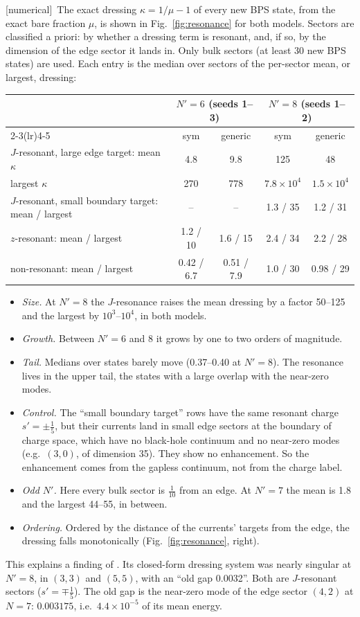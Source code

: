 \documentclass[11pt]{article}
\newcommand{\Np}{N'}
\newcommand{\sn}{s'}
\newcommand{\tagbox}[2]{\textsf{\small\color{#1}[#2]}}
\newcommand{\NUM}{\tagbox{cnum}{numerical}}
\theoremstyle{plain}
\theoremstyle{remark}
\numberwithin{equation}{section}
\begin{document}
\NUM\ The exact dressing $\kappa=1/\mu-1$ of every new BPS state, from the exact bare fraction $\mu$, is shown in
Fig.~\ref{fig:resonance} for both models.
Sectors are classified a priori: by whether a dressing term is resonant, and, if so, by the dimension of the edge sector
it lands in. Only bulk sectors (at least 30 new BPS states) are used. Each entry is the median over sectors of the
per-sector mean, or largest, dressing:
\begin{center}\small
\begin{tabular}{lcccc}
\toprule
 & \multicolumn{2}{c}{$\Np=6$ (seeds 1--3)} & \multicolumn{2}{c}{$\Np=8$ (seeds 1--2)}\\
\cmidrule(lr){2-3}\cmidrule(lr){4-5}
 & sym & generic & sym & generic\\
\midrule
$J$-resonant, large edge target: mean $\kappa$ & 4.8 & 9.8 & 125 & 48\\
\qquad largest $\kappa$ & 270 & 778 & $7.8\times10^4$ & $1.5\times10^4$\\
$J$-resonant, small boundary target: mean / largest & -- & -- & 1.3 / 35 & 1.2 / 31\\
$z$-resonant: mean / largest & 1.2 / 10 & 1.6 / 15 & 2.4 / 34 & 2.2 / 28\\
non-resonant: mean / largest & 0.42 / 6.7 & 0.51 / 7.9 & 1.0 / 30 & 0.98 / 29\\
\bottomrule
\end{tabular}
\end{center}
\begin{itemize}\itemsep2pt
\item \emph{Size.} At $\Np=8$ the $J$-resonance raises the mean dressing by a factor 50--125 and the largest by
  $10^3$--$10^4$, in both models.
\item \emph{Growth.} Between $\Np=6$ and 8 it grows by one to two orders of magnitude.
\item \emph{Tail.} Medians over states barely move (0.37--0.40 at $\Np=8$). The resonance lives in the upper tail, the
  states with a large overlap with the near-zero modes.
\item \emph{Control.} The ``small boundary target'' rows have the same resonant charge $\sn=\pm\tfrac15$, but their
  currents land in small edge sectors at the boundary of charge space, which have no black-hole continuum and no near-zero
  modes (e.g.\ $(3,0)$, of dimension 35). They show no enhancement. So the enhancement comes from the gapless
  continuum, not from the charge label.
\item \emph{Odd $\Np$.} Here every bulk sector is $\tfrac1{10}$ from an edge. At $\Np=7$ the mean is 1.8 and the largest
  44--55, in between.
\item \emph{Ordering.} Ordered by the distance of the currents' targets from the edge, the dressing falls monotonically
  (Fig.~\ref{fig:resonance}, right).
\end{itemize}
This explains a finding of \cite{prog1023}. Its closed-form dressing system was nearly singular at $\Np=8$, in $(3,3)$
and $(5,5)$, with an ``old gap 0.0032''. Both are $J$-resonant sectors ($\sn=\mp\tfrac15$). The old gap is the near-zero
mode of the edge sector $(4,2)$ at $N=7$: $0.003175$, i.e.\ $4.4\times10^{-5}$ of its mean energy.
\end{document}
